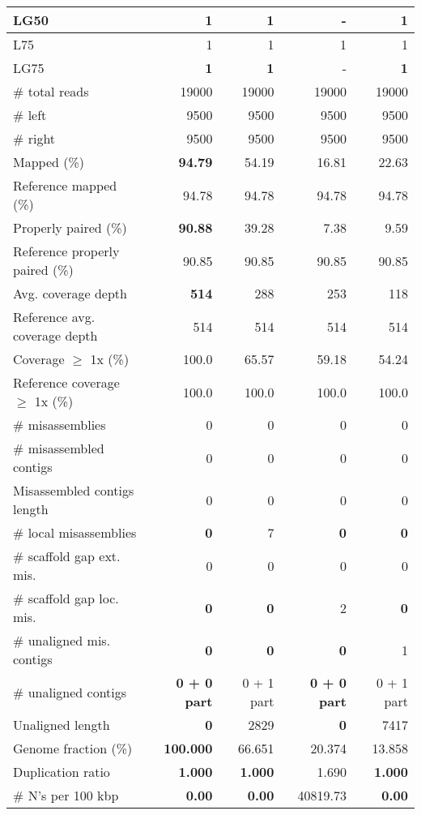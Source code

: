 \documentclass[12pt,a4paper]{article}
\begin{document}
\begin{table}[ht]
\begin{center}
\begin{tabular}{|l*{4}{|r}|}
LG50 & {\bf 1} & {\bf 1} & - & {\bf 1} \\ \hline
L75 & 1 & 1 & 1 & 1 \\ \hline
LG75 & {\bf 1} & {\bf 1} & - & {\bf 1} \\ \hline
\# total reads & 19000 & 19000 & 19000 & 19000 \\ \hline
\# left & 9500 & 9500 & 9500 & 9500 \\ \hline
\# right & 9500 & 9500 & 9500 & 9500 \\ \hline
Mapped (\%) & {\bf 94.79} & 54.19 & 16.81 & 22.63 \\ \hline
Reference mapped (\%) & 94.78 & 94.78 & 94.78 & 94.78 \\ \hline
Properly paired (\%) & {\bf 90.88} & 39.28 & 7.38 & 9.59 \\ \hline
Reference properly paired (\%) & 90.85 & 90.85 & 90.85 & 90.85 \\ \hline
Avg. coverage depth & {\bf 514} & 288 & 253 & 118 \\ \hline
Reference avg. coverage depth & 514 & 514 & 514 & 514 \\ \hline
Coverage $\geq$ 1x (\%) & 100.0 & 65.57 & 59.18 & 54.24 \\ \hline
Reference coverage $\geq$ 1x (\%) & 100.0 & 100.0 & 100.0 & 100.0 \\ \hline
\# misassemblies & 0 & 0 & 0 & 0 \\ \hline
\# misassembled contigs & 0 & 0 & 0 & 0 \\ \hline
Misassembled contigs length & 0 & 0 & 0 & 0 \\ \hline
\# local misassemblies & {\bf 0} & 7 & {\bf 0} & {\bf 0} \\ \hline
\# scaffold gap ext. mis. & 0 & 0 & 0 & 0 \\ \hline
\# scaffold gap loc. mis. & {\bf 0} & {\bf 0} & 2 & {\bf 0} \\ \hline
\# unaligned mis. contigs & {\bf 0} & {\bf 0} & {\bf 0} & 1 \\ \hline
\# unaligned contigs & {\bf 0 + 0 part} & 0 + 1 part & {\bf 0 + 0 part} & 0 + 1 part \\ \hline
Unaligned length & {\bf 0} & 2829 & {\bf 0} & 7417 \\ \hline
Genome fraction (\%) & {\bf 100.000} & 66.651 & 20.374 & 13.858 \\ \hline
Duplication ratio & {\bf 1.000} & {\bf 1.000} & 1.690 & {\bf 1.000} \\ \hline
\# N's per 100 kbp & {\bf 0.00} & {\bf 0.00} & 40819.73 & {\bf 0.00} \\ \hline

\end{tabular}
\end{center}
\end{table}
\end{document}
